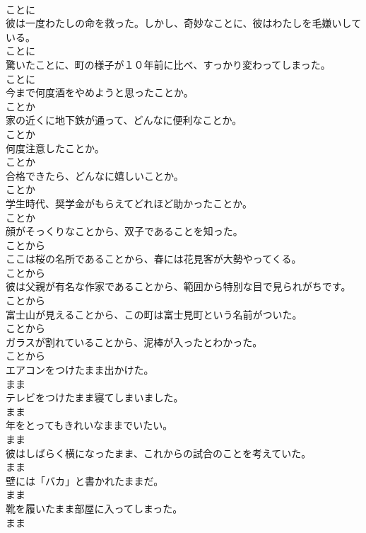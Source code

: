 \documentclass[8pt]{extreport}
\begin{document}
\begin{CJK}{UTF8}{min}
\\	ことに
\\	彼は一度わたしの命を救った。しかし、奇妙なことに、彼はわたしを毛嫌いしている。	
\\	ことに
\\	驚いたことに、町の様子が１０年前に比べ、すっかり変わってしまった。	
\\	ことに
\\	今まで何度酒をやめようと思ったことか。	
\\	ことか
\\	家の近くに地下鉄が通って、どんなに便利なことか。	
\\	ことか
\\	何度注意したことか。	
\\	ことか
\\	合格できたら、どんなに嬉しいことか。	
\\	ことか
\\	学生時代、奨学金がもらえてどれほど助かったことか。	
\\	ことか
\\	顔がそっくりなことから、双子であることを知った。	
\\	ことから
\\	ここは桜の名所であることから、春には花見客が大勢やってくる。	
\\	ことから
\\	彼は父親が有名な作家であることから、範囲から特別な目で見られがちです。	
\\	ことから
\\	富士山が見えることから、この町は富士見町という名前がついた。	
\\	ことから
\\	ガラスが割れていることから、泥棒が入ったとわかった。	
\\	ことから
\\	エアコンをつけたまま出かけた。	
\\	まま
\\	テレビをつけたまま寝てしまいました。	
\\	まま
\\	年をとってもきれいなままでいたい。	
\\	まま
\\	彼はしばらく横になったまま、これからの試合のことを考えていた。	
\\	まま
\\	壁には「バカ」と書かれたままだ。	
\\	まま
\\	靴を履いたまま部屋に入ってしまった。	
\\	まま

\end{CJK}
\end{document}
